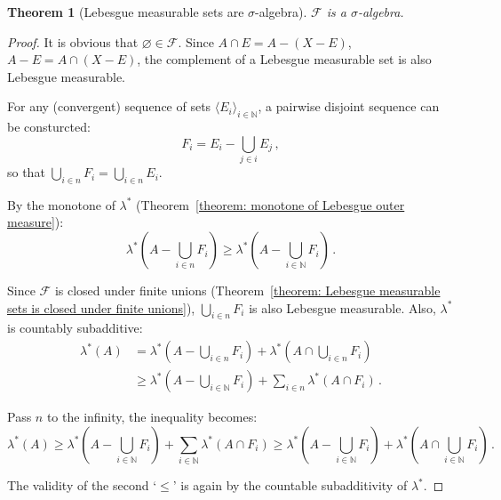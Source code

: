 \documentclass[openany]{book}
\theoremstyle{plain}
\newtheorem{theorem}{Theorem}[section] %
\theoremstyle{definition}
\begin{document}
\begin{theorem}[Lebesgue measurable sets are $\sigma$-algebra]
	\label{theorem: Lebesgue measurable sets are sigma-algebra}
	$\mathscr F$ is a $\sigma$-algebra.
\end{theorem}
\begin{proof}
	It is obvious that $\varnothing \in \mathscr F$.
	Since $A \cap E = A - (X - E)$, $A - E = A \cap (X - E)$, the complement of a Lebesgue measurable set is also Lebesgue measurable.

	For any (convergent) sequence of sets $\langle E_i \rangle_{i \in \mathbb N}$, a pairwise disjoint sequence can be consturcted:
	\begin{equation*}
		F_i = E_i - \bigcup_{j \in i} E_j\,,
	\end{equation*}
	so that $\bigcup_{i \in n} F_i = \bigcup_{i \in n} E_i$.

	By the monotone of $\lambda^*$ (Theorem~\ref{theorem: monotone of Lebesgue outer measure}):
	\begin{equation*}
		\lambda^* \left( A - \bigcup_{i \in n} F_i \right) 
			\geq \lambda^* \left( A - \bigcup_{i \in \mathbb N} F_i \right)\,.
	\end{equation*}

	Since $\mathscr F$ is closed under finite unions%
		(Theorem~\ref{theorem: Lebesgue measurable sets is closed under finite unions}), 
	$\bigcup_{i \in n} F_i$ is also Lebesgue measurable.
	Also, $\lambda^*$ is countably subadditive:
	\begin{align*}
		\lambda^*(A) 
		&= \lambda^*\left( A - \bigcup_{i \in n} F_i \right) 
			+  \lambda^*\left( A \cap \bigcup_{i \in n} F_i \right)
		\\
		&\geq  \lambda^* \left( A - \bigcup_{i \in \mathbb N} F_i \right) 
			+ \sum_{i \in n} \lambda^* (A \cap F_i)\,. 
	\end{align*}

	Pass $n$ to the infinity, the inequality becomes:
	\begin{equation*}
		\lambda^*(A) 
		\geq  \lambda^* \left( A - \bigcup_{i \in \mathbb N} F_i \right) 
			+ \sum_{i \in \mathbb N} \lambda^* (A \cap F_i)
		\geq \lambda^* \left( A - \bigcup_{i \in \mathbb N} F_i \right) 
		+ \lambda^* \left( A \cap \bigcup_{i \in \mathbb N} F_i \right) \,.
	\end{equation*}

	The validity of the second `$\leq$' is again by the countable subadditivity of $\lambda^*$.
\end{proof}
\end{document}
